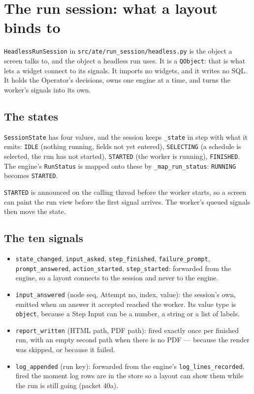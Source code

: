 \chapter{The run session: what a layout binds to}\label{ch:session}

\texttt{HeadlessRunSession} in \texttt{src/\allowbreak{}ate/\allowbreak{}run\_\allowbreak{}session/\allowbreak{}headless.py} is the object a screen talks
to, and the object a headless run uses. It is a \texttt{QObject}: that is what lets a widget connect to
its signals. It imports no widgets, and it writes no SQL. It holds the Operator's decisions, owns one
engine at a time, and turns the worker's signals into its own.

\section{The states}

\texttt{SessionState} has four values, and the session keeps \texttt{\_state} in step with what it
emits: \texttt{IDLE} (nothing running, fields not yet entered), \texttt{SELECTING} (a schedule is
selected, the run has not started), \texttt{STARTED} (the worker is running), \texttt{FINISHED}. The
engine's \texttt{RunStatus} is mapped onto these by \texttt{\_map\_run\_status}: \texttt{RUNNING}
becomes \texttt{STARTED}.

\texttt{STARTED} is announced on the calling thread before the worker starts, so a screen can paint the
run view before the first signal arrives. The worker's queued signals then move the state.

\section{The ten signals}

\begin{itemize}
  \item \texttt{state\_changed}, \texttt{input\_asked}, \texttt{step\_finished}, \texttt{failure\_prompt},
    \texttt{prompt\_answered}, \texttt{action\_started}, \texttt{step\_started}: forwarded from the
    engine, so a layout connects to the session and never to the engine.
  \item \texttt{input\_answered} (node seq, Attempt no, index, value): the session's own, emitted when an
    answer it accepted reached the worker. Its value type is \texttt{object}, because a Step Input can be
    a number, a string or a list of labels.
  \item \texttt{report\_written} (HTML path, PDF path): fired exactly once per finished run, with an
    empty second path when there is no PDF --- because the render was skipped, or because it failed.
  \item \texttt{log\_appended} (run key): forwarded from the engine's \texttt{log\_lines\_recorded},
    fired the moment log rows are in the store so a layout can show them while the run is still going
    (packet 40a).
\end{itemize}

